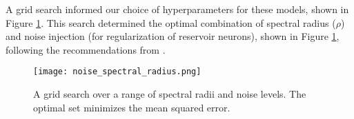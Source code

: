 A grid search informed our choice of hyperparameters for these models, shown in
Figure \ref{fig:gridsearch}. This search determined the optimal combination of
spectral radius ($\rho$) and noise injection (for regularization of reservoir
neurons), shown in Figure \ref{fig:gridsearch}, following the recommendations
from \cite{lukosevicius_practical_2012}.

\begin{figure}[h]
  \centering
  \texttt{[image: noise\_spectral\_radius.png]}
  \caption{A grid search over a range of spectral radii and noise levels. The
  optimal set minimizes the mean squared error.}
  \label{fig:gridsearch}
\end{figure}
